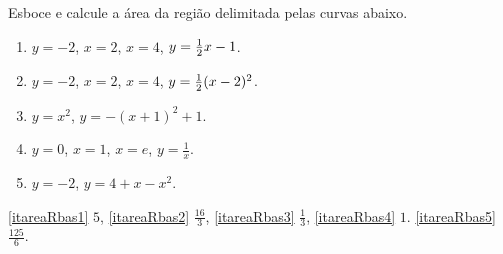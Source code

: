\begin{exo}
Esboce e calcule a área da região delimitada pelas curvas abaixo.
\begin{multicols}{2}
\begin{enumerate}
\item\label{itareaRbas1}  $y=-2$, $x=2$, $x=4$, $y=\frac{1}{2} x-1$.
\item\label{itareaRbas2} $y=-2$, $x=2$, $x=4$, $y=\frac{1}{2} (x-2)^2$.
\item\label{itareaRbas3} $y=x^2$, $y=-(x+1)^2+1$.
\item \label{itareaRbas4} $y=0$, $x=1$, $x=e$, $y=\tfrac1x$.
\item \label{itareaRbas5} $y=-2$,  $y=4+x-x^2$.
\end{enumerate}
\end{multicols}
\vspace{0.01cm}
\begin{sol}
\eqref{itareaRbas1} $5$, 
\eqref{itareaRbas2} $\frac{16}{3}$,
\eqref{itareaRbas3} $\frac{1}{3}$,
\eqref{itareaRbas4} $1$.
\eqref{itareaRbas5} $\tfrac{125}{6}$.
\end{sol}
\end{exo}



